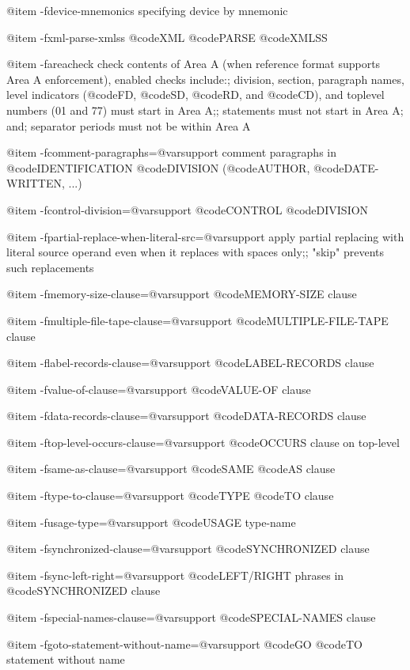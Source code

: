 @item -fdevice-mnemonics
specifying device by mnemonic

@item -fxml-parse-xmlss
@code{XML} @code{PARSE} @code{XMLSS}

@item -fareacheck
check contents of Area A (when reference format supports Area A enforcement),
enabled checks include:; division, section, paragraph names, level indicators (@code{FD}, @code{SD}, @code{RD}, and @code{CD}),
and toplevel numbers (01 and 77) must start in Area A;; statements must not start in Area A; and; separator periods must not be within Area A

@item -fcomment-paragraphs=@var{support}
comment paragraphs in @code{IDENTIFICATION} @code{DIVISION} (@code{AUTHOR}, @code{DATE-WRITTEN}, ...)

@item -fcontrol-division=@var{support}
@code{CONTROL} @code{DIVISION}

@item -fpartial-replace-when-literal-src=@var{support}
apply partial replacing with literal source operand even when it replaces with spaces only;; "skip" prevents such replacements

@item -fmemory-size-clause=@var{support}
@code{MEMORY-SIZE} clause

@item -fmultiple-file-tape-clause=@var{support}
@code{MULTIPLE-FILE-TAPE} clause

@item -flabel-records-clause=@var{support}
@code{LABEL-RECORDS} clause

@item -fvalue-of-clause=@var{support}
@code{VALUE-OF} clause

@item -fdata-records-clause=@var{support}
@code{DATA-RECORDS} clause

@item -ftop-level-occurs-clause=@var{support}
@code{OCCURS} clause on top-level

@item -fsame-as-clause=@var{support}
@code{SAME} @code{AS} clause

@item -ftype-to-clause=@var{support}
@code{TYPE} @code{TO} clause

@item -fusage-type=@var{support}
@code{USAGE} type-name

@item -fsynchronized-clause=@var{support}
@code{SYNCHRONIZED} clause

@item -fsync-left-right=@var{support}
@code{LEFT/RIGHT} phrases in @code{SYNCHRONIZED} clause

@item -fspecial-names-clause=@var{support}
@code{SPECIAL-NAMES} clause

@item -fgoto-statement-without-name=@var{support}
@code{GO} @code{TO} statement without name

